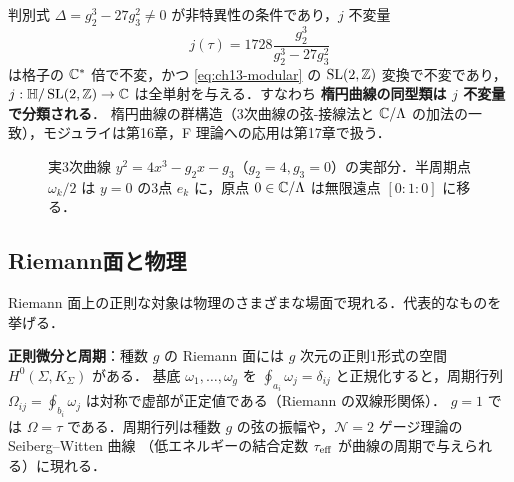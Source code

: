 判別式 $\Delta = g_2^3-27g_3^2\neq0$ が非特異性の条件であり，$j$ 不変量
\begin{equation}
  j(\tau) = 1728\frac{g_2^3}{g_2^3-27g_3^2}
\end{equation}
は格子の $\mathbb{C}^*$ 倍で不変，かつ \eqref{eq:ch13-modular} の $\operatorname{SL}(2,\mathbb{Z})$ 変換で不変であり，
$j:\mathbb{H}/\operatorname{SL}(2,\mathbb{Z})\to\mathbb{C}$ は全単射を与える．すなわち \textbf{楕円曲線の同型類は $j$ 不変量で分類される}．
楕円曲線の群構造（3次曲線の弦-接線法と $\mathbb{C}/\Lambda$ の加法の一致），モジュライは第16章，F 理論への応用は第17章で扱う．

\begin{figure}[ht]
\centering
{}
\caption{実3次曲線 $y^2=4x^3-g_2x-g_3$（$g_2=4,g_3=0$）の実部分．半周期点 $\omega_k/2$ は $y=0$ の3点 $e_k$ に，原点 $0\in\mathbb{C}/\Lambda$ は無限遠点 $[0:1:0]$ に移る．}
\end{figure}

\subsection{Riemann面と物理}

Riemann 面上の正則な対象は物理のさまざまな場面で現れる．代表的なものを挙げる．

\textbf{正則微分と周期}：種数 $g$ の Riemann 面には $g$ 次元の正則1形式の空間 $H^0(\Sigma,K_\Sigma)$ がある．
基底 $\omega_1,\dots,\omega_g$ を $\oint_{a_i}\omega_j=\delta_{ij}$ と正規化すると，周期行列
$\Omega_{ij}=\oint_{b_i}\omega_j$ は対称で虚部が正定値である（Riemann の双線形関係）．
$g=1$ では $\Omega=\tau$ である．周期行列は種数 $g$ の弦の振幅や，$\mathcal{N}=2$ ゲージ理論の Seiberg--Witten 曲線
（低エネルギーの結合定数 $\tau_{\rm eff}$ が曲線の周期で与えられる）に現れる．

